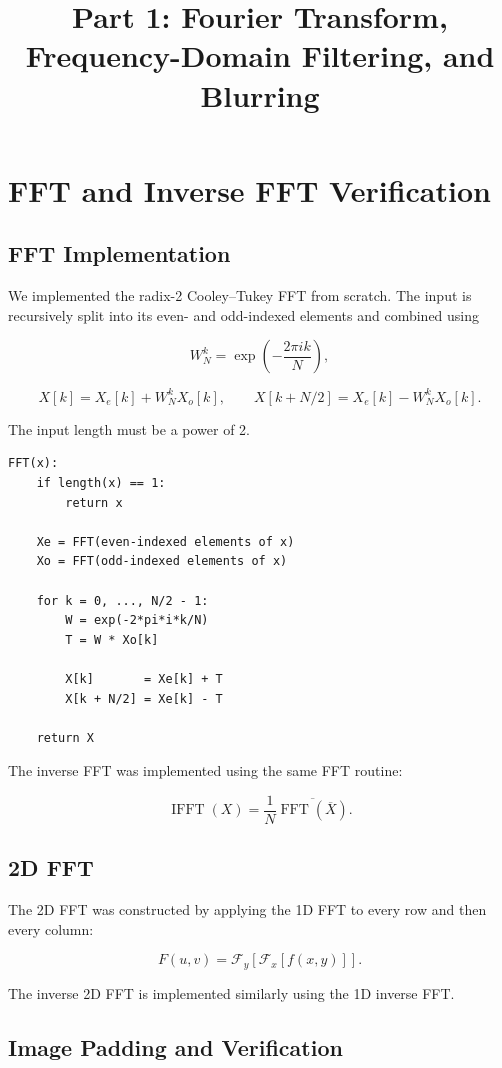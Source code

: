 \documentclass[11pt,a4paper]{article}
\title{\textbf{\Large Part 1: Fourier Transform, Frequency-Domain Filtering, and Blurring}}
\author{}
\date{}
\begin{document}
\maketitle

\section{FFT and Inverse FFT Verification}

\subsection{FFT Implementation}

We implemented the radix-2 Cooley--Tukey FFT from scratch. The input is recursively split into its even- and odd-indexed elements and combined using

\[
W_N^k=\exp\left(-\frac{2\pi i k}{N}\right),
\]

\[
X[k]=X_e[k]+W_N^kX_o[k],
\qquad
X[k+N/2]=X_e[k]-W_N^kX_o[k].
\]

The input length must be a power of 2.

\begin{lstlisting}[style=console,caption={Radix-2 1D FFT}]
FFT(x):
    if length(x) == 1:
        return x

    Xe = FFT(even-indexed elements of x)
    Xo = FFT(odd-indexed elements of x)

    for k = 0, ..., N/2 - 1:
        W = exp(-2*pi*i*k/N)
        T = W * Xo[k]

        X[k]       = Xe[k] + T
        X[k + N/2] = Xe[k] - T

    return X
\end{lstlisting}

The inverse FFT was implemented using the same FFT routine:

\[
\operatorname{IFFT}(X)
=
\frac{1}{N}
\overline{\operatorname{FFT}(\overline{X})}.
\]

\subsection{2D FFT}

The 2D FFT was constructed by applying the 1D FFT to every row and then every column:

\[
F(u,v)=
\mathcal{F}_y\left[\mathcal{F}_x[f(x,y)]\right].
\]

The inverse 2D FFT is implemented similarly using the 1D inverse FFT.

\subsection{Image Padding and Verification}
\end{document}
